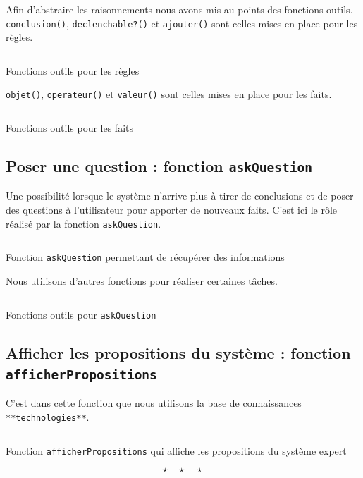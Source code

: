 \documentclass[a4paper,12pt]{article}
\begin{document}
Afin d'abstraire les raisonnements nous avons mis au points des fonctions outils. \texttt{conclusion()}, \texttt{declenchable?()} et \texttt{ajouter()} sont celles mises en place pour les règles.
\begin{listing}[H]
	\centering
	\inputminted[breaklines=true,linenos]{lisp}{../fonctionsOutilsRegles.lisp}
	\caption{Fonctions outils pour les règles}
\end{listing}

\texttt{objet()}, \texttt{operateur()} et \texttt{valeur()} sont celles mises en place pour les faits.

\begin{listing}[H]
	\centering
	\inputminted[breaklines=true,linenos]{lisp}{../fonctionsOutilsFaits.lisp}
	\caption{Fonctions outils pour les faits}
\end{listing}

\subsection{Poser une question : fonction \texttt{askQuestion}}

Une possibilité lorsque le système n'arrive plus à tirer de conclusions et de poser des questions à l'utilisateur pour apporter de nouveaux faits. C'est ici le rôle réalisé par la fonction \texttt{askQuestion}.

\begin{listing}[H]
	\centering
	\inputminted[breaklines=true,linenos, firstline = 22]{lisp}{../askQuestion.lisp}
	\caption{Fonction \texttt{askQuestion} permettant de récupérer des informations}
\end{listing}

Nous utilisons d'autres fonctions pour réaliser certaines tâches.

\begin{listing}[H]
	\centering
	\inputminted[breaklines=true,linenos, lastline = 21]{lisp}{../askQuestion.lisp}
	\caption{Fonctions outils pour \texttt{askQuestion}}
\end{listing}

\subsection{Afficher les propositions du système : fonction \texttt{afficherPropositions}}

	C'est dans cette fonction que nous utilisons la base de connaissances \texttt{**technologies**}.

\begin{listing}[H]
	\centering
	\inputminted[breaklines=true,linenos]{lisp}{../afficherPropositions.lisp}
	\caption{Fonction \texttt{afficherPropositions} qui affiche les propositions du système expert}
\end{listing}


\[ \star \quad \star \quad \star \]
\newpage

\end{document}
